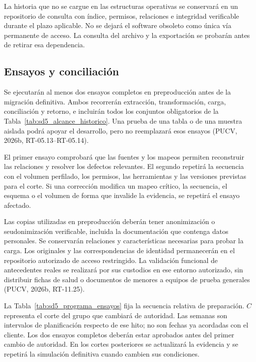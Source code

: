 La historia que no se cargue en las estructuras operativas se conservará en un repositorio de consulta con índice, permisos, relaciones e integridad verificable durante el plazo aplicable. No se dejará el software obsoleto como única vía permanente de acceso. La consulta del archivo y la exportación se probarán antes de retirar esa dependencia.

\subsection{Ensayos y conciliación}
Se ejecutarán al menos dos ensayos completos en preproducción antes de la migración definitiva. Ambos recorrerán extracción, transformación, carga, conciliación y retorno, e incluirán todos los conjuntos obligatorios de la Tabla~\ref{tab:sd5_alcance_historico}. Una prueba de una tabla o de una muestra aislada podrá apoyar el desarrollo, pero no reemplazará esos ensayos (PUCV, 2026b, RT-05.13--RT-05.14).

El primer ensayo comprobará que las fuentes y los mapeos permiten reconstruir las relaciones y resolver los defectos relevantes. El segundo repetirá la secuencia con el volumen perfilado, los permisos, las herramientas y las versiones previstas para el corte. Si una corrección modifica un mapeo crítico, la secuencia, el esquema o el volumen de forma que invalide la evidencia, se repetirá el ensayo afectado.

Las copias utilizadas en preproducción deberán tener anonimización o seudonimización verificable, incluida la documentación que contenga datos personales. Se conservarán relaciones y características necesarias para probar la carga. Los originales y las correspondencias de identidad permanecerán en el repositorio autorizado de acceso restringido. La validación funcional de antecedentes reales se realizará por sus custodios en ese entorno autorizado, sin distribuir fichas de salud o documentos de menores a equipos de prueba generales (PUCV, 2026b, RT-11.25).

La Tabla~\ref{tab:sd5_programa_ensayos} fija la secuencia relativa de preparación. \(C\) representa el corte del grupo que cambiará de autoridad. Las semanas son intervalos de planificación respecto de ese hito; no son fechas ya acordadas con el cliente. Los dos ensayos completos deberán estar aprobados antes del primer cambio de autoridad. En los cortes posteriores se actualizará la evidencia y se repetirá la simulación definitiva cuando cambien sus condiciones.

